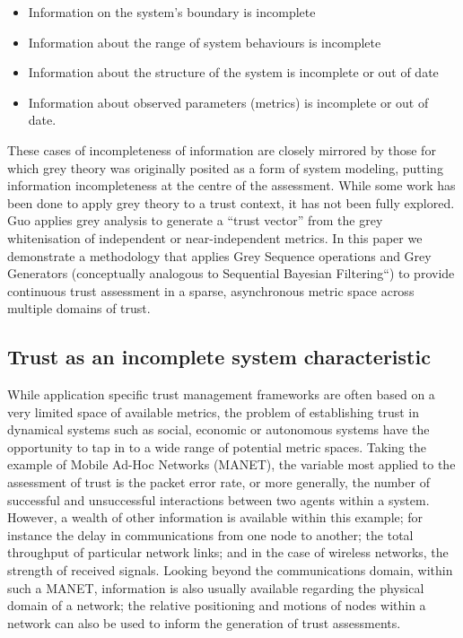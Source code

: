 \begin{itemize}
  \item Information on the system's boundary is incomplete
  \item Information about the range of system behaviours is incomplete
  \item Information about the structure of the system is incomplete or out of date
  \item Information about observed parameters (metrics) is incomplete or out of date.
\end{itemize}

These cases of incompleteness of information are closely mirrored by those for which grey theory was originally posited as a form of system modeling, putting information incompleteness at the centre of the assessment. 
While some work \cite{Guo11} has been done to apply grey theory to a trust context, it has not been fully explored.
Guo applies grey analysis to generate a ``trust vector'' from the grey whitenisation of independent or near-independent metrics. 
In this paper we demonstrate a methodology that applies Grey Sequence operations and Grey Generators (conceptually analogous to Sequential Bayesian Filtering``) to provide continuous trust assessment in a sparse, asynchronous metric space across multiple domains of trust.

\subsection{Trust as an incomplete system characteristic}

While application specific trust management frameworks are often based on a very limited space of available metrics, the problem of establishing trust in dynamical systems such as social, economic or autonomous systems have the opportunity to tap in to a wide range of potential metric spaces. 
Taking the example of Mobile Ad-Hoc Networks (MANET), the variable most applied to the assessment of trust is the packet error rate, or more generally, the number of successful and unsuccessful interactions between two agents within a system.
However, a wealth of other information is available within this example; for instance the delay in communications from one node to another; the total throughput of particular network links; and in the case of wireless networks, the strength of received signals.
Looking beyond the communications domain, within such a MANET, information is also usually available regarding the physical domain of a network; the relative positioning and motions of nodes within a network can also be used to inform the generation of trust assessments.



